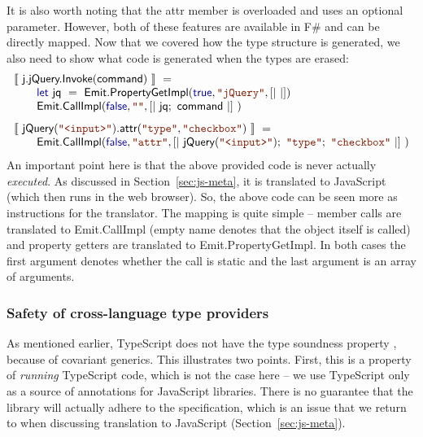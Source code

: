 \documentclass[submission,copyright,creativecommons]{eptcs}
\newcommand{\sem}[1]{\llbracket #1 \rrbracket}
\newcommand{\kvd}[1]{\textnormal{\textcolor{kvdclr}{\sffamily #1}}}
\newcommand{\str}[1]{\textnormal{\textcolor{strclr}{\ttfamily "#1"}}}
\newcommand{\ident}[1]{\textnormal{\sffamily #1}}
\begin{document}
\noindent
It is also worth noting that the \ident{attr} member is overloaded and uses an optional parameter.
However, both of these features are available in F\# and can be directly mapped. Now that we 
covered how the type structure is generated, we also need to show what code is generated when 
the types are erased:
%
\begin{equation*}
\begin{array}{l}
 \sem{~\ident{j.jQuery.Invoke}(\ident{command})~} ~= \\
 \qquad \kvd{let}~\ident{jq}~=~\ident{Emit.PropertyGetImpl}(\kvd{true}, \str{jQuery}, \lbrack|~|\rbrack) \\
 \qquad \ident{Emit.CallImpl}(\kvd{false}, \str{}, \lbrack|~ \ident{jq};~ \ident{command}~|\rbrack~) \\[0.75em]
 \sem{~\ident{jQuery}(\str{<input>})\ident{.attr}(\str{type},\str{checkbox})~} ~= \\
 \qquad \ident{Emit.CallImpl}(\kvd{false}, \str{attr}, \lbrack|~ \ident{jQuery}(\str{<input>});~\str{type};~\str{checkbox}~|\rbrack~)
\end{array}
\end{equation*}
%
An important point here is that the above provided code is never actually \emph{executed}. 
As discussed in Section~\ref{sec:js-meta}, it is translated to JavaScript (which then runs
in the web browser). So, the above code can be seen more as instructions for the translator.
The mapping is quite simple -- member calls are translated to \ident{Emit.CallImpl} (empty
name denotes that the object itself is called) and property getters are translated to 
\ident{Emit.PropertyGetImpl}. In both cases the first argument denotes whether the call is
static and the last argument is an array of arguments.

\subsubsection{Safety of cross-language type providers}
As mentioned earlier, TypeScript does not have the type soundness property \cite{ms-safets},
because of covariant generics. This illustrates two points. First, this is a property of
\emph{running} TypeScript code, which is not the case here -- we use TypeScript only as a
source of annotations for JavaScript libraries. There is no guarantee that the library will 
actually adhere to the specification, which is an issue that we return to when discussing
translation to JavaScript (Section~\ref{sec:js-meta}).
\end{document}
